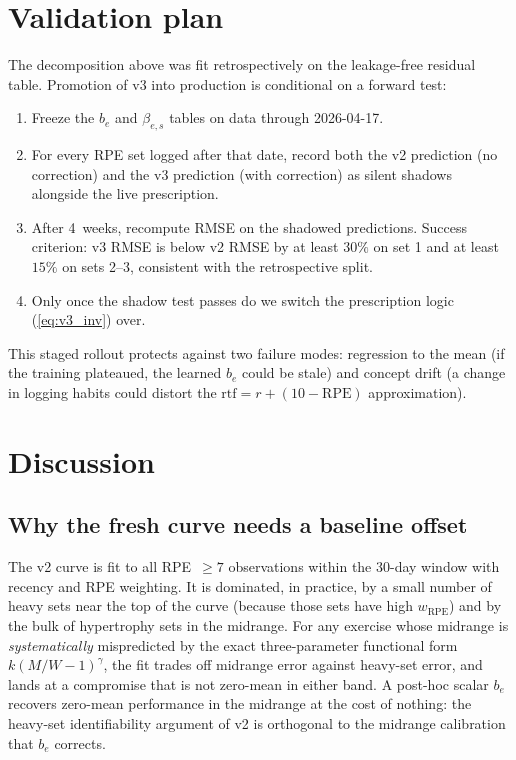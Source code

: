 \documentclass[11pt]{article}
\begin{document}
\section{Validation plan}
\label{sec:validation}

The decomposition above was fit retrospectively on the leakage-free residual table.
Promotion of v3 into production is conditional on a forward test:
\begin{enumerate}
\item Freeze the $b_e$ and $\beta_{e,s}$ tables on data through 2026-04-17.
\item For every RPE set logged after that date, record both the v2 prediction (no correction) and the v3 prediction (with correction) as silent shadows alongside the live prescription.
\item After 4~weeks, recompute RMSE on the shadowed predictions.
Success criterion: v3 RMSE is below v2 RMSE by at least $30\%$ on set 1 and at least $15\%$ on sets 2--3, consistent with the retrospective split.
\item Only once the shadow test passes do we switch the prescription logic (\cref{eq:v3_inv}) over.
\end{enumerate}
This staged rollout protects against two failure modes: regression to the mean (if the training plateaued, the learned $b_e$ could be stale) and concept drift (a change in logging habits could distort the $\mathrm{rtf} = r + (10-\mathrm{RPE})$ approximation).

\section{Discussion}
\label{sec:discussion}

\subsection{Why the fresh curve needs a baseline offset}
The v2 curve is fit to all RPE~$\ge 7$ observations within the 30-day window with recency and RPE weighting.
It is dominated, in practice, by a small number of heavy sets near the top of the curve (because those sets have high $w_\mathrm{RPE}$) and by the bulk of hypertrophy sets in the midrange.
For any exercise whose midrange is \emph{systematically} mispredicted by the exact three-parameter functional form $k(M/W-1)^\gamma$, the fit trades off midrange error against heavy-set error, and lands at a compromise that is not zero-mean in either band.
A post-hoc scalar $b_e$ recovers zero-mean performance in the midrange at the cost of nothing: the heavy-set identifiability argument of v2 is orthogonal to the midrange calibration that $b_e$ corrects.
\end{document}
